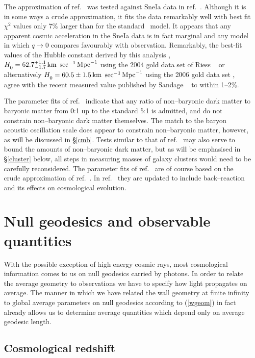 \documentclass[12pt]{article}
\begin{document}
The approximation of ref.\ \cite{paper0} was tested against
SneIa data in ref.\ \cite{paper1}. Although it is in some ways a
crude approximation, it fits the data remarkably well with best fit $\chi^2$
values only 7\% larger than for the standard \LCDM\ model. It appears that any
apparent cosmic acceleration in the SneIa data is in fact marginal and any
model in which $q\to0$ compares favourably with observation. Remarkably,
the best-fit values of the Hubble constant derived by this analysis
\cite{paper1}, $\Hm=62.7^{+1.1}_{-1.7}\kmsMpc$ using the
2004 gold data set of Riess \etal~\cite{Riess04} or alternatively
$\Hm=60.5\pm1.5\kmsMpc$ using the 2006 gold data set \cite{Riess06},
agree with the recent measured value published by
Sandage \etal\ \cite{Sandage} to within 1--2\%.

The parameter fits of ref.\ \cite{paper1} indicate that any ratio of
non--baryonic dark matter to baryonic matter from 0:1 up to the standard
5:1 is admitted, and do not constrain non--baryonic dark matter themselves.
The match to the baryon acoustic oscillation scale does appear to constrain
non--baryonic matter, however, as will be discussed in \S\ref{cmb}.
Tests similar to that of ref.\ \cite{Allen} may also serve
to bound the amounts of non--baryonic dark matter,
but as will be emphasised in \S\ref{cluster} below, all steps in
measuring masses of galaxy clusters would need to be carefully
reconsidered.
The parameter fits of ref.\ \cite{paper1} are of course based on the
crude approximation of ref.\ \cite{paper0}. In ref.\ \cite{paper2}
they are updated to include back--reaction and its effects on cosmological
evolution.

\section{Null geodesics and observable quantities\label{obs}}

With the possible exception of high energy cosmic rays, most cosmological
information comes to us on null geodesics carried by photons. In order
to relate the average geometry to observations we have to specify how
light propagates on average. The manner in which we have related the
wall geometry at finite infinity to global average parameters on
null geodesics according to (\ref{wgeom}) in fact already allows us
to determine average quantities which depend only on average geodesic
length.

\subsection{Cosmological redshift\label{red}}
\end{document}

